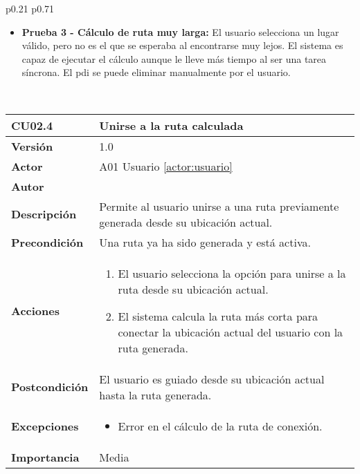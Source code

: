 \begin{table}[H]
\begin{tabularx}{\linewidth}{ p{0.21\columnwidth} p{0.71\columnwidth} }
\begin{itemize}
			\vspace{2pt}
			\item \textbf{Prueba 3 - Cálculo de ruta muy larga:} El usuario selecciona un lugar válido, pero no es el que se esperaba al encontrarse muy lejos. El sistema es capaz de ejecutar el cálculo aunque le lleve más tiempo al ser una tarea síncrona. El \acrshort{pdi} se puede eliminar manualmente por el usuario.
		\end{itemize} \\
		\bottomrule
	\end{tabularx}
	\caption{CU02.3 Añadir \acrfull{pdi}}
	\label{cu:añadir-pdi}
\end{table}


\begin{table}[H]
	\centering
	\begin{tabularx}{\linewidth}{ p{} p{} }
		\toprule
		\textbf{CU02.4}    & \textbf{Unirse a la ruta calculada} \\
		\toprule
		\textbf{Versión}              & 1.0    \\
		\textbf{Actor}                & A01 Usuario \ref{actor:usuario} \\
		\textbf{Autor}                & \autor \\
		\textbf{Descripción}          & Permite al usuario unirse a una ruta previamente generada desde su ubicación actual. \\
		\textbf{Precondición}         & Una ruta ya ha sido generada y está activa. \\
		\textbf{Acciones}             &
		\begin{enumerate}
			\def\labelenumi{\arabic{enumi}.}
			\tightlist
			\item El usuario selecciona la opción para unirse a la ruta desde su ubicación actual.
			\item El sistema calcula la ruta más corta para conectar la ubicación actual del usuario con la ruta generada.
		\end{enumerate}\\
		\textbf{Postcondición}        & El usuario es guiado desde su ubicación actual hasta la ruta generada. \\
		\textbf{Excepciones}          & 
		\begin{itemize}
			\tightlist
			\item Error en el cálculo de la ruta de conexión.
		\end{itemize}\\
		\textbf{Importancia}          & Media \\

\end{tabularx}
\end{table}
